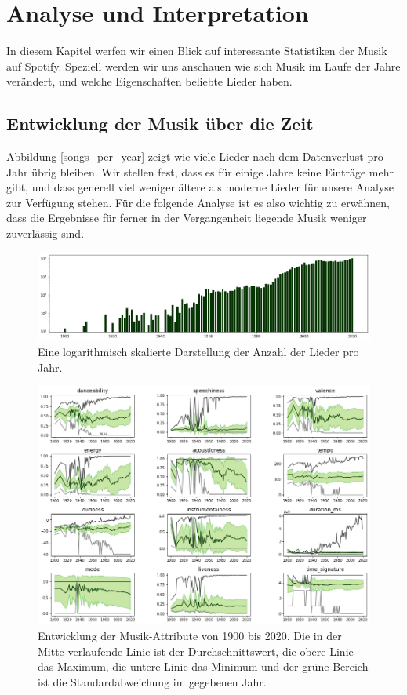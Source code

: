 \documentclass[conference]{IEEEtran}
\begin{document}
\section{Analyse und Interpretation}
In diesem Kapitel werfen wir einen Blick auf interessante Statistiken der Musik auf Spotify. Speziell werden wir uns anschauen wie sich Musik im Laufe der Jahre verändert, und welche Eigenschaften beliebte Lieder haben.
\subsection{Entwicklung der Musik über die Zeit}
Abbildung \eqref{songs_per_year} zeigt wie viele Lieder nach dem Datenverlust pro Jahr übrig bleiben. Wir stellen fest, dass es für einige Jahre keine Einträge mehr gibt, und dass generell viel weniger ältere als moderne Lieder für unsere Analyse zur Verfügung stehen. Für die folgende Analyse ist es also wichtig zu erwähnen, dass die Ergebnisse für ferner in der Vergangenheit liegende Musik weniger zuverlässig sind.
\begin{figure}[t]
\centering
\includegraphics[width=\textwidth]{images/songs_per_year.png}
\caption{Eine logarithmisch skalierte Darstellung der Anzahl der Lieder pro Jahr.}
\label{songs_per_year}
\end{figure}
\begin{figure}[t]
\centering
\includegraphics[width=\textwidth]{images/over_time.png}
\caption{Entwicklung der Musik-Attribute von 1900 bis 2020. Die in der Mitte verlaufende Linie ist der Durchschnittswert, die obere Linie das Maximum, die untere Linie das Minimum und der grüne Bereich ist die Standardabweichung im gegebenen Jahr.}
\label{time}
\end{figure}
\end{document}

